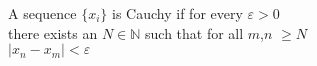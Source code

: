 \documentclass[preview]{standalone}
\begin{document}
\begin{center}
A sequence $\{x_i\}$ is Cauchy if for every $\varepsilon > 0$\\there exists an $N$$\in \mathbb{N}$ such that for all $m$,$n$ $\geq N$\\$\left| x_n - x_m \right| < \varepsilon$
\end{center}
\end{document}
